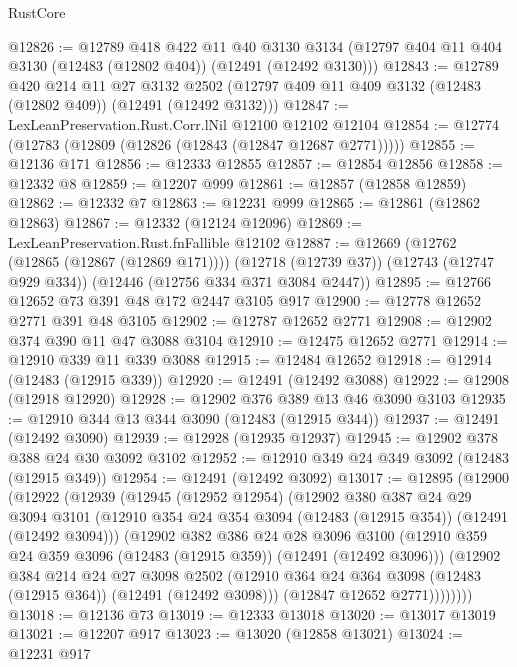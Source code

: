 \begin{lexlean}{RustCore}
\begin{coremodule}
@12826 := @12789
    @418
    @422
    @11
    @40
    @3130
    @3134
    (@12797 @404 @11 @404 @3130 (@12483 (@12802 @404)) (@12491 (@12492 @3130)))
@12843 := @12789
    @420
    @214
    @11
    @27
    @3132
    @2502
    (@12797 @409 @11 @409 @3132 (@12483 (@12802 @409)) (@12491 (@12492 @3132)))
@12847 := LexLeanPreservation.Rust.Corr.lNil @12100 @12102 @12104
@12854 := @12774 (@12783 (@12809 (@12826 (@12843 (@12847 @12687 @2771)))))
@12855 := @12136 @171
@12856 := @12333 @12855
@12857 := @12854 @12856
@12858 := @12332 @8
@12859 := @12207 @999
@12861 := @12857 (@12858 @12859)
@12862 := @12332 @7
@12863 := @12231 @999
@12865 := @12861 (@12862 @12863)
@12867 := @12332 (@12124 @12096)
@12869 := LexLeanPreservation.Rust.fnFallible @12102
@12887 := @12669
    (@12762 (@12865 (@12867 (@12869 @171))))
    (@12718 (@12739 @37))
    (@12743 (@12747 @929 @334))
    (@12446 (@12756 @334 @371 @3084 @2447))
@12895 := @12766 @12652 @73 @391 @48 @172 @2447 @3105 @917
@12900 := @12778 @12652 @2771 @391 @48 @3105
@12902 := @12787 @12652 @2771
@12908 := @12902 @374 @390 @11 @47 @3088 @3104
@12910 := @12475 @12652 @2771
@12914 := @12910 @339 @11 @339 @3088
@12915 := @12484 @12652
@12918 := @12914 (@12483 (@12915 @339))
@12920 := @12491 (@12492 @3088)
@12922 := @12908 (@12918 @12920)
@12928 := @12902 @376 @389 @13 @46 @3090 @3103
@12935 := @12910 @344 @13 @344 @3090 (@12483 (@12915 @344))
@12937 := @12491 (@12492 @3090)
@12939 := @12928 (@12935 @12937)
@12945 := @12902 @378 @388 @24 @30 @3092 @3102
@12952 := @12910 @349 @24 @349 @3092 (@12483 (@12915 @349))
@12954 := @12491 (@12492 @3092)
@13017 := @12895
    (@12900
      (@12922
        (@12939
          (@12945
            (@12952 @12954)
            (@12902
              @380
              @387
              @24
              @29
              @3094
              @3101
              (@12910 @354 @24 @354 @3094 (@12483 (@12915 @354)) (@12491 (@12492 @3094)))
              (@12902
                @382
                @386
                @24
                @28
                @3096
                @3100
                (@12910 @359 @24 @359 @3096 (@12483 (@12915 @359)) (@12491 (@12492 @3096)))
                (@12902
                  @384
                  @214
                  @24
                  @27
                  @3098
                  @2502
                  (@12910 @364 @24 @364 @3098 (@12483 (@12915 @364)) (@12491 (@12492 @3098)))
                  (@12847 @12652 @2771))))))))
@13018 := @12136 @73
@13019 := @12333 @13018
@13020 := @13017 @13019
@13021 := @12207 @917
@13023 := @13020 (@12858 @13021)
@13024 := @12231 @917

\end{coremodule}
\end{lexlean}
